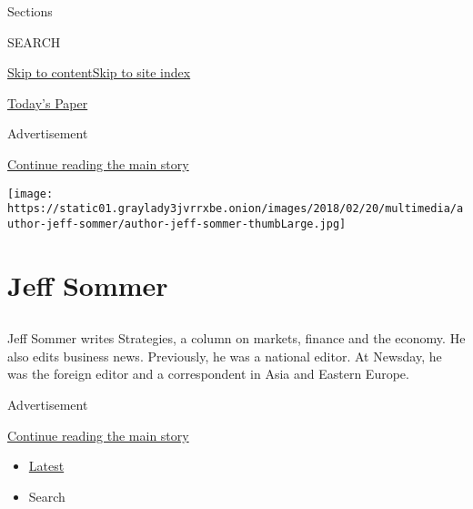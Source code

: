 Sections

SEARCH

\protect\hyperlink{site-content}{Skip to
content}\protect\hyperlink{site-index}{Skip to site index}

\href{https://myaccount.nytimes3xbfgragh.onion/auth/login?response_type=cookie\&client_id=vi}{}

\href{https://www.nytimes3xbfgragh.onion/section/todayspaper}{Today's
Paper}

Advertisement

\protect\hyperlink{after-top}{Continue reading the main story}

\texttt{[image: https://static01.graylady3jvrrxbe.onion/images/2018/02/20/multimedia/author-jeff-sommer/author-jeff-sommer-thumbLarge.jpg]}

\hypertarget{jeff-sommer}{%
\section{Jeff Sommer}\label{jeff-sommer}}

\subsection{}

Jeff Sommer writes Strategies, a column on markets, finance and the
economy. He also edits business news. Previously, he was a national
editor. At Newsday, he was the foreign editor and a correspondent in
Asia and Eastern Europe.

Advertisement

\protect\hyperlink{after-mid1}{Continue reading the main story}

\begin{itemize}
\tightlist
\item
  \protect\hyperlink{stream-panel}{Latest}
\item
  Search
\end{itemize}


